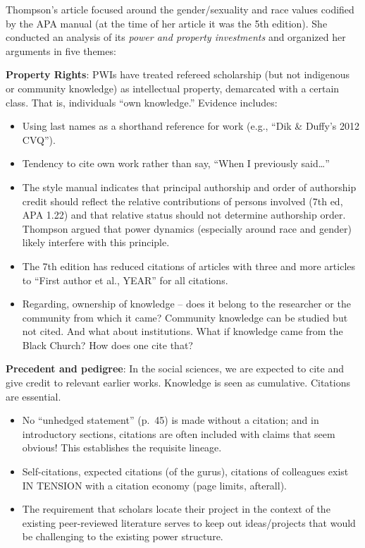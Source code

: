 \documentclass[
  11pt,
]{book}
\providecommand{\tightlist}{%
  \setlength{\itemsep}{0pt}\setlength{\parskip}{0pt}}
\begin{document}
Thompson's \citeyearpar{thompson_gentlemanly_2004} article focused around the gender/sexuality and race values codified by the APA manual (at the time of her article it was the 5th edition). She conducted an analysis of its \emph{power and property investments} and organized her arguments in five themes:

\textbf{Property Rights}: PWIs have treated refereed scholarship (but not indigenous or community knowledge) as intellectual property, demarcated with a certain class. That is, individuals ``own knowledge.'' Evidence includes:

\begin{itemize}
\tightlist
\item
  Using last names as a shorthand reference for work (e.g., ``Dik \& Duffy's 2012 CVQ'').
\item
  Tendency to cite own work rather than say, ``When I previously said\ldots{}''
\item
  The style manual indicates that principal authorship and order of authorship credit should reflect the relative contributions of persons involved (7th ed, APA 1.22) and that relative status should not determine authorship order. Thompson argued that power dynamics (especially around race and gender) likely interfere with this principle.
\item
  The 7th edition has reduced citations of articles with three and more articles to ``First author et al., YEAR'' for all citations.\\
\item
  Regarding, ownership of knowledge -- does it belong to the researcher or the community from which it came? Community knowledge can be studied but not cited. And what about institutions. What if knowledge came from the Black Church? How does one cite that?
\end{itemize}

\textbf{Precedent and pedigree}: In the social sciences, we are expected to cite and give credit to relevant earlier works. Knowledge is seen as cumulative. Citations are essential.

\begin{itemize}
\tightlist
\item
  No ``unhedged statement'' (p.~45) is made without a citation; and in introductory sections, citations are often included with claims that seem obvious! This establishes the requisite lineage.
\item
  Self-citations, expected citations (of the gurus), citations of colleagues exist IN TENSION with a citation economy (page limits, afterall).
\item
  The requirement that scholars locate their project in the context of the existing peer-reviewed literature serves to keep out ideas/projects that would be challenging to the existing power structure.
\end{itemize}
\end{document}

